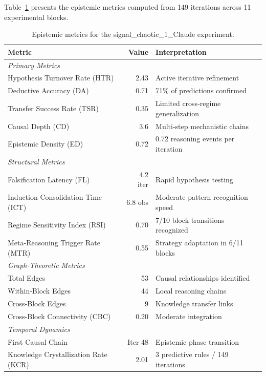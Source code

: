 \documentclass[10pt,twocolumn]{article}
\begin{document}
Table~\ref{tab:epistemic_metrics} presents the epistemic metrics computed from 149 iterations across 11 experimental blocks.

\begin{table}[htbp]
\centering
\caption{Epistemic metrics for the signal\_chaotic\_1\_Claude experiment.}
\label{tab:epistemic_metrics}
\begin{tabular}{lrp{6cm}}
\toprule
\textbf{Metric} & \textbf{Value} & \textbf{Interpretation} \\
\midrule
\multicolumn{3}{l}{\emph{Primary Metrics}} \\
Hypothesis Turnover Rate (HTR) & 2.43 & Active iterative refinement \\
Deductive Accuracy (DA) & 0.71 & 71\% of predictions confirmed \\
Transfer Success Rate (TSR) & 0.35 & Limited cross-regime generalization \\
Causal Depth (CD) & 3.6 & Multi-step mechanistic chains \\
Epistemic Density (ED) & 0.72 & 0.72 reasoning events per iteration \\
\midrule
\multicolumn{3}{l}{\emph{Structural Metrics}} \\
Falsification Latency (FL) & 4.2 iter & Rapid hypothesis testing \\
Induction Consolidation Time (ICT) & 6.8 obs & Moderate pattern recognition speed \\
Regime Sensitivity Index (RSI) & 0.70 & 7/10 block transitions recognized \\
Meta-Reasoning Trigger Rate (MTR) & 0.55 & Strategy adaptation in 6/11 blocks \\
\midrule
\multicolumn{3}{l}{\emph{Graph-Theoretic Metrics}} \\
Total Edges & 53 & Causal relationships identified \\
Within-Block Edges & 44 & Local reasoning chains \\
Cross-Block Edges & 9 & Knowledge transfer links \\
Cross-Block Connectivity (CBC) & 0.20 & Moderate integration \\
\midrule
\multicolumn{3}{l}{\emph{Temporal Dynamics}} \\
First Causal Chain & Iter 48 & Epistemic phase transition \\
Knowledge Crystallization Rate (KCR) & 2.01 & 3 predictive rules / 149 iterations \\
\bottomrule
\end{tabular}
\end{table}
\end{document}
